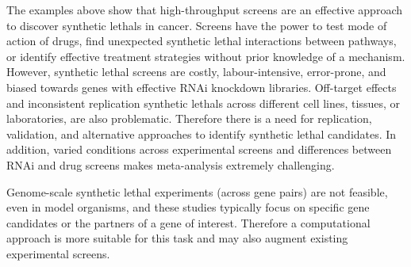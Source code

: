 
The examples above show that high-throughput screens are an effective approach to discover \glspl{synthetic lethal} in cancer. %
Screens have the power to test mode of action of drugs, find unexpected \gls{synthetic lethal} interactions between \glspl{pathway}, or identify effective treatment strategies without prior knowledge of a mechanism. However, \gls{synthetic lethal} screens are costly, labour-intensive, error-prone, and biased towards genes with effective \gls{RNAi} knockdown libraries. 
Off-target effects and inconsistent replication \glspl{synthetic lethal} across different cell lines, tissues, or laboratories, are also problematic. 
Therefore there is a need for replication, validation, and alternative approaches to identify \gls{synthetic lethal} candidates. In addition, varied conditions across experimental screens and differences between \gls{RNAi} and drug screens makes meta-analysis extremely challenging.

Genome-scale \gls{synthetic lethal} experiments (across gene pairs) are not feasible, even in model organisms, and these studies typically focus on specific gene candidates or the partners of a gene of interest. %
Therefore a computational approach is more suitable for this task and may also augment existing experimental screens. %

